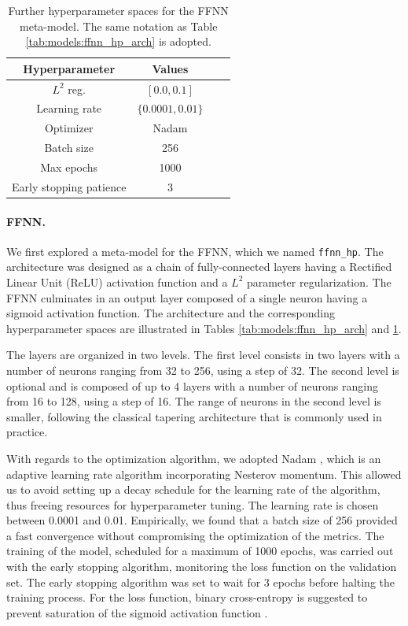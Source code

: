 \documentclass{article}
\begin{document}
\begin{table}
    \centering
    \begin{tabular}{cccc}
        \toprule
        Hyperparameter & Values \\
        \midrule
        $L^2$ reg. & $[0.0, 0.1]$ \\
        Learning rate & $\{0.0001, 0.01\}$ \\
        Optimizer & Nadam \\
        Batch size & 256 \\
        Max epochs & 1000 \\
        Early stopping patience & 3 \\
        \bottomrule
    \end{tabular}
    \caption{Further hyperparameter spaces for the FFNN meta-model. The same notation as Table \ref{tab:models:ffnn_hp_arch} is adopted.}
    \label{tab:models:ffnn_hp_hps}
\end{table}


\paragraph{FFNN.} We first explored a meta-model for the FFNN, which we named \texttt{ffnn\_hp}. The architecture was designed as a chain of fully-connected layers having a Rectified Linear Unit (ReLU) activation function and a $L^2$ parameter regularization. The FFNN culminates in an output layer composed of a single neuron having a sigmoid activation function. The architecture and the corresponding hyperparameter spaces are illustrated in Tables \ref{tab:models:ffnn_hp_arch} and \ref{tab:models:ffnn_hp_hps}.

The layers are organized in two levels. The first level consists in two layers with a number of neurons ranging from 32 to 256, using a step of 32. The second level is optional and is composed of up to 4 layers with a number of neurons ranging from 16 to 128, using a step of 16. The range of neurons in the second level is smaller, following the classical tapering architecture that is commonly used in practice.

With regards to the optimization algorithm, we adopted Nadam \cite{dozat16nadam}, which is an adaptive learning rate algorithm incorporating Nesterov momentum. This allowed us to avoid setting up a decay schedule for the learning rate of the algorithm, thus freeing resources for hyperparameter tuning. The learning rate is chosen between 0.0001 and 0.01. Empirically, we found that a batch size of 256 provided a fast convergence without compromising the optimization of the metrics. The training of the model, scheduled for a maximum of 1000 epochs, was carried out with the early stopping algorithm, monitoring the loss function on the validation set. The early stopping algorithm was set to wait for 3 epochs before halting the training process. For the loss function, binary cross-entropy is suggested to prevent saturation of the sigmoid activation function \cite{goodfellow16}.
\end{document}
